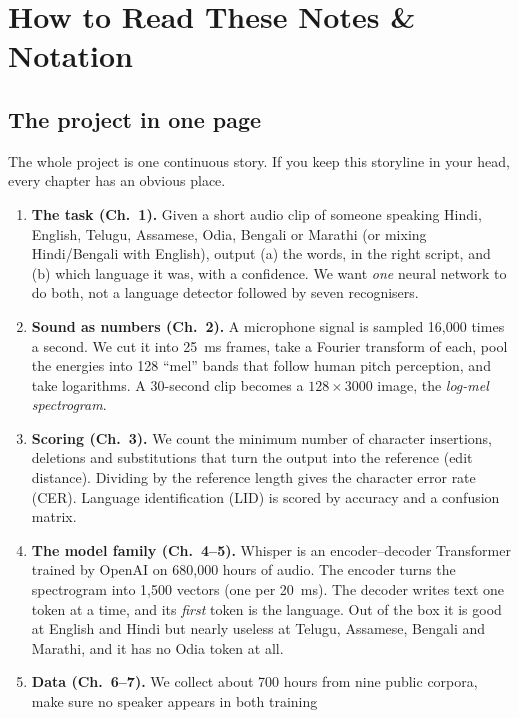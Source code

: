 \chapter*{How to Read These Notes \& Notation}

\section*{The project in one page}

The whole project is one continuous story. If you keep this storyline in your head, every chapter has an obvious place.

\begin{enumerate}[leftmargin=*]
\item \textbf{The task (Ch.~1).} Given a short audio clip of someone speaking Hindi, English, Telugu, Assamese, Odia, Bengali or
Marathi (or mixing Hindi/Bengali with English), output (a) the words, in the right script, and (b) which language it was, with a
confidence. We want \emph{one} neural network to do both, not a language detector followed by seven recognisers.
\item \textbf{Sound as numbers (Ch.~2).} A microphone signal is sampled 16{,}000 times a second. We cut it into 25~ms frames,
take a Fourier transform of each, pool the energies into 128 ``mel'' bands that follow human pitch perception, and take logarithms.
A 30-second clip becomes a $128\times 3000$ image, the \emph{log-mel spectrogram}.
\item \textbf{Scoring (Ch.~3).} We count the minimum number of character insertions, deletions and substitutions that turn the
output into the reference (edit distance). Dividing by the reference length gives the character error rate (CER). Language
identification (LID) is scored by accuracy and a confusion matrix.
\item \textbf{The model family (Ch.~4--5).} Whisper is an encoder--decoder Transformer trained by OpenAI on 680{,}000 hours of
audio. The encoder turns the spectrogram into 1{,}500 vectors (one per 20~ms). The decoder writes text one token at a time, and its
\emph{first} token is the language. Out of the box it is good at English and Hindi but nearly useless at Telugu, Assamese,
Bengali and Marathi, and it has no Odia token at all.
\item \textbf{Data (Ch.~6--7).} We collect about 700 hours from nine public corpora, make sure no speaker appears in both training

\end{enumerate}
